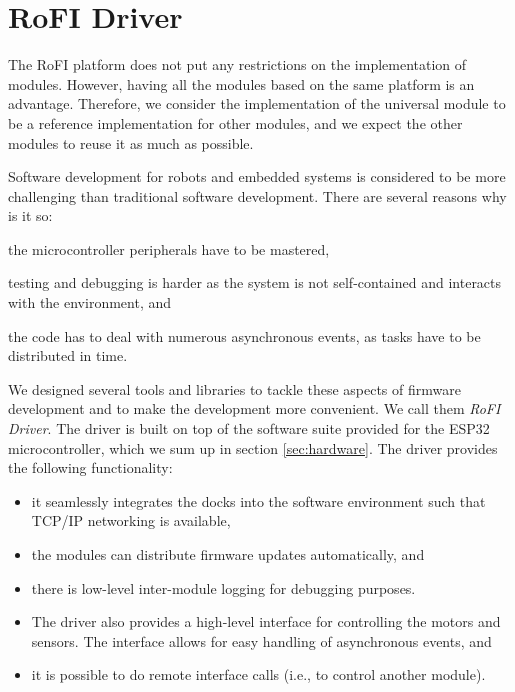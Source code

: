\chapter{RoFI Driver}\label{chap:software}

The RoFI platform does not put any restrictions on the implementation of
modules. However, having all the modules based on the same platform is an
advantage. Therefore, we consider the implementation of the universal module to
be a reference implementation for other modules, and we expect the other modules
to reuse it as much as possible.

Software development for robots and embedded systems is considered to be more
challenging than traditional software development. There are several reasons
why is it so:
\begin{enumerate*}
    \item the microcontroller peripherals have to be mastered,
    \item testing and debugging is harder as the system is not self-contained
    and interacts with the environment, and
    \item the code has to deal with numerous asynchronous events, as tasks have
    to be distributed in time.
\end{enumerate*}

We designed several tools and libraries to tackle these aspects of firmware
development and to make the development more convenient. We call them \emph{RoFI
Driver}. The driver is built on top of the software suite provided for the ESP32
microcontroller, which we sum up in section \ref{sec:hardware}. The driver
provides the following functionality:
\begin{itemize}
    \item it seamlessly integrates the docks into the software environment such
    that TCP/IP networking is available,
    \item the modules can distribute firmware updates automatically, and
    \item there is low-level inter-module logging for debugging purposes.
    \item The driver also provides a high-level interface for controlling the
    motors and sensors. The interface allows for easy handling of asynchronous
    events, and
    \item it is possible to do remote interface calls (i.e., to control another
    module).
\end{itemize}

